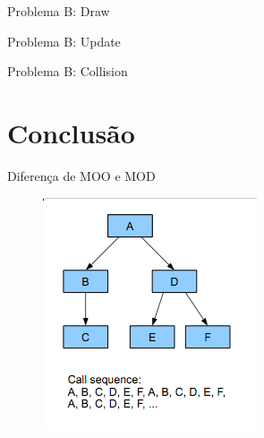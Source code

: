 \documentclass{beamer}
\begin{document}
\begin{frame}[t]{Problema B: Draw}
\end{frame}

\begin{frame}[t]{Problema B: Update}
\end{frame}

\begin{frame}[t]{Problema B: Collision}
\end{frame}

\section{Conclusão}

\frame{\tableofcontents[currentsection]}

\begin{frame}[t]{Diferença de MOO e MOD}
    \begin{figure}
    \centering
        \begin{minipage}[b]{0.35\textwidth}
            \includegraphics[width=\textwidth]{figuras/objectreadingorder}
        \end{minipage}
        \begin{minipage}[b]{0.35\textwidth}

\end{minipage}
\end{figure}
\end{frame}
\end{document}
